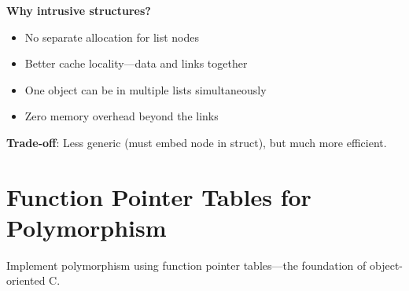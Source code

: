 \textbf{Why intrusive structures?}
\begin{itemize}
    \item No separate allocation for list nodes
    \item Better cache locality—data and links together
    \item One object can be in multiple lists simultaneously
    \item Zero memory overhead beyond the links
\end{itemize}

\textbf{Trade-off}: Less generic (must embed node in struct), but much more efficient.

\section{Function Pointer Tables for Polymorphism}

Implement polymorphism using function pointer tables—the foundation of object-oriented C.

